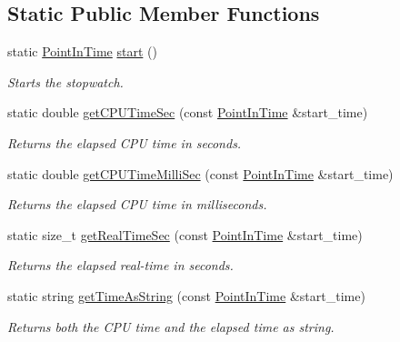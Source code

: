 \subsection*{Static Public Member Functions}
\begin{DoxyCompactItemize}
\item 
static \hyperlink{Options_8h_af3a9f634f27bed7e98dbc23e5c6f807d}{Point\-In\-Time} \hyperlink{classStopwatch_ae4e530c454d40a88256a76744d3d8a12}{start} ()
\begin{DoxyCompactList}\small\item\em Starts the stopwatch. \end{DoxyCompactList}\item 
static double \hyperlink{classStopwatch_a27dda7191760c2822e3aad879805e013}{get\-C\-P\-U\-Time\-Sec} (const \hyperlink{Options_8h_af3a9f634f27bed7e98dbc23e5c6f807d}{Point\-In\-Time} \&start\-\_\-time)
\begin{DoxyCompactList}\small\item\em Returns the elapsed C\-P\-U time in seconds. \end{DoxyCompactList}\item 
static double \hyperlink{classStopwatch_a7ba33aa62a14801f379e05e8d4f98d2a}{get\-C\-P\-U\-Time\-Milli\-Sec} (const \hyperlink{Options_8h_af3a9f634f27bed7e98dbc23e5c6f807d}{Point\-In\-Time} \&start\-\_\-time)
\begin{DoxyCompactList}\small\item\em Returns the elapsed C\-P\-U time in milliseconds. \end{DoxyCompactList}\item 
static size\-\_\-t \hyperlink{classStopwatch_a700dbdfb01479ece147c15d149eba157}{get\-Real\-Time\-Sec} (const \hyperlink{Options_8h_af3a9f634f27bed7e98dbc23e5c6f807d}{Point\-In\-Time} \&start\-\_\-time)
\begin{DoxyCompactList}\small\item\em Returns the elapsed real-\/time in seconds. \end{DoxyCompactList}\item 
static string \hyperlink{classStopwatch_a4b6869082a043c822dc22944e4c1a5e2}{get\-Time\-As\-String} (const \hyperlink{Options_8h_af3a9f634f27bed7e98dbc23e5c6f807d}{Point\-In\-Time} \&start\-\_\-time)
\begin{DoxyCompactList}\small\item\em Returns both the C\-P\-U time and the elapsed time as string. \end{DoxyCompactList}\end{DoxyCompactItemize}
